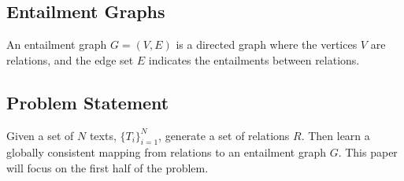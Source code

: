 \subsection{Entailment Graphs}
An entailment graph $G=(V,E)$ is a directed graph where the vertices $V$
are relations, and the edge set $E$ indicates the entailments between
relations.
\subsection{Problem Statement}
Given a set of $N$ texts, $\{T_i\}_{i=1}^{N}$, generate a set of 
relations $R$. Then learn a globally consistent mapping
from relations to an entailment graph $G$. This paper will focus
on the first half of the problem.

